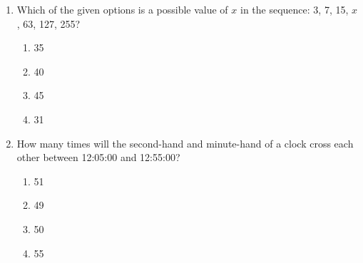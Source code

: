 \documentclass{article}
\begin{document}
\begin{enumerate}[leftmargin=*, label=Q.\arabic*.]
    \item Which of the given options is a possible value of $x$ in the sequence: 3, 7, 15, $x$, 63, 127, 255?

    \begin{multicols}{4}
        \begin{enumerate}
            \item 35
            \item 40
            \item 45
            \item 31
        \end{enumerate}
    \end{multicols}

    \item How many times will the second-hand and minute-hand of a clock cross each other between 12:05:00 and 12:55:00?

    \begin{multicols}{4}
        \begin{enumerate}
            \item 51
            \item 49
            \item 50
            \item 55
        \end{enumerate}
    \end{multicols}
\end{enumerate}
\end{document}
